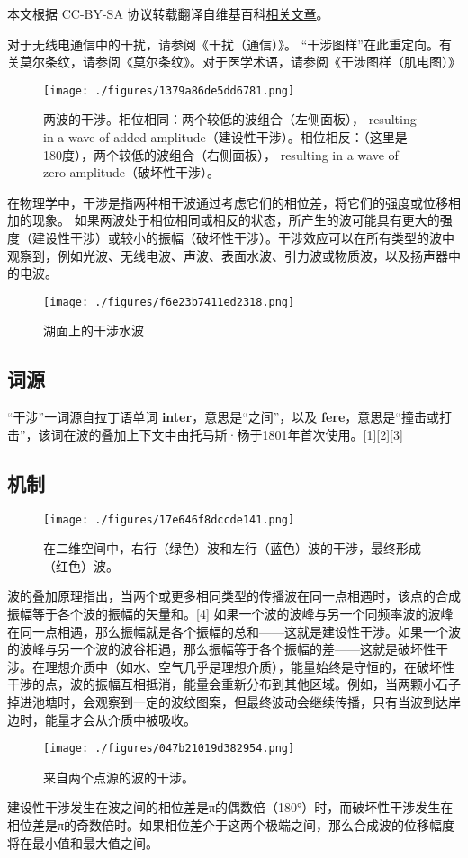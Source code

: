 
本文根据 CC-BY-SA 协议转载翻译自维基百科\href{https://en.wikipedia.org/wiki/Wave_interference}{相关文章}。

对于无线电通信中的干扰，请参阅《干扰（通信）》。
“干涉图样”在此重定向。有关莫尔条纹，请参阅《莫尔条纹》。对于医学术语，请参阅《干涉图样（肌电图）》
\begin{figure}[ht]
\centering
\texttt{[image: ./figures/1379a86de5dd6781.png]}
\caption{两波的干涉。相位相同：两个较低的波组合（左侧面板）， resulting in a wave of added amplitude（建设性干涉）。相位相反：（这里是180度），两个较低的波组合（右侧面板）， resulting in a wave of zero amplitude（破坏性干涉）。} \label{fig_GSWLX_1}
\end{figure}
在物理学中，干涉是指两种相干波通过考虑它们的相位差，将它们的强度或位移相加的现象。 如果两波处于相位相同或相反的状态，所产生的波可能具有更大的强度（建设性干涉）或较小的振幅（破坏性干涉）。干涉效应可以在所有类型的波中观察到，例如光波、无线电波、声波、表面水波、引力波或物质波，以及扬声器中的电波。
\begin{figure}[ht]
\centering
\texttt{[image: ./figures/f6e23b7411ed2318.png]}
\caption{湖面上的干涉水波} \label{fig_GSWLX_2}
\end{figure}
\subsection{词源}  
“干涉”一词源自拉丁语单词 \textbf{inter}，意思是“之间”，以及 \textbf{fere}，意思是“撞击或打击”，该词在波的叠加上下文中由托马斯·杨于1801年首次使用。[1][2][3]
\subsection{机制}
\begin{figure}[ht]
\centering
\texttt{[image: ./figures/17e646f8dccde141.png]}
\caption{在二维空间中，右行（绿色）波和左行（蓝色）波的干涉，最终形成（红色）波。} \label{fig_GSWLX_3}
\end{figure}
波的叠加原理指出，当两个或更多相同类型的传播波在同一点相遇时，该点的合成振幅等于各个波的振幅的矢量和。[4] 如果一个波的波峰与另一个同频率波的波峰在同一点相遇，那么振幅就是各个振幅的总和——这就是建设性干涉。如果一个波的波峰与另一个波的波谷相遇，那么振幅等于各个振幅的差——这就是破坏性干涉。在理想介质中（如水、空气几乎是理想介质），能量始终是守恒的，在破坏性干涉的点，波的振幅互相抵消，能量会重新分布到其他区域。例如，当两颗小石子掉进池塘时，会观察到一定的波纹图案，但最终波动会继续传播，只有当波到达岸边时，能量才会从介质中被吸收。
\begin{figure}[ht]
\centering
\texttt{[image: ./figures/047b21019d382954.png]}
\caption{来自两个点源的波的干涉。} \label{fig_GSWLX_4}
\end{figure}
建设性干涉发生在波之间的相位差是π的偶数倍（180°）时，而破坏性干涉发生在相位差是π的奇数倍时。如果相位差介于这两个极端之间，那么合成波的位移幅度将在最小值和最大值之间。

